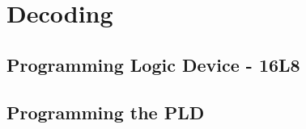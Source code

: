 \newpage
\section{Decoding}

    \subsection{Programming Logic Device - 16L8}

    \subsection{Programming the PLD}

